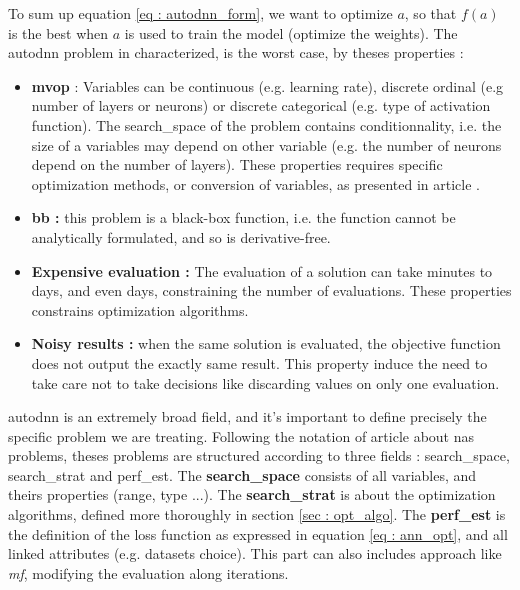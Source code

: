 To sum up equation \ref{eq : autodnn_form}, we want to optimize $a$, so that $f(a)$ is the best when $a$ is used to train the model (optimize the weights). The \acrshort{autodnn} problem in characterized, is the worst case, by theses properties : 
\begin{itemize}
    \item \textbf{\acrfull{mvop}} : Variables can be continuous (e.g. learning rate), discrete ordinal (e.g number of layers or neurons) or discrete categorical (e.g. type of activation function). The \gls{search_space} of the problem contains conditionnality, i.e. the size of a variables may depend on other variable (e.g. the number of neurons depend on the number of layers). These properties requires specific optimization methods, or conversion of variables, as presented in article \cite{talbi_metaheuristics_2024}.
    \item \textbf{\Gls{bb} :} this problem is a black-box function, i.e. the function cannot be analytically formulated, and so is derivative-free.
    \item \textbf{Expensive evaluation :} The evaluation of a solution can take minutes to days, and even days, constraining the number of evaluations. These properties constrains optimization algorithms. 
    \item \textbf{ Noisy results : } when the same solution is evaluated, the objective function does not output the exactly same result. This property induce the need to take care not to take decisions like discarding values on only one evaluation. 
\end{itemize}

\acrshort{autodnn} is an extremely broad field, and it's important to define precisely the specific problem we are treating. Following the notation of article \cite{elsken_neural_2019} about \acrshort{nas} problems, theses problems are structured according to three fields : \Gls{search_space}, \Gls{search_strat} and \Gls{perf_est}. The \textbf{\gls{search_space}} consists of all variables, and theirs properties (range, type ...). The \textbf{\gls{search_strat}} is about the optimization algorithms, defined more thoroughly in section \ref{sec : opt_algo}. The \textbf{\gls{perf_est}} is the definition of the loss function as expressed in equation \ref{eq : ann_opt}, and all linked attributes (e.g. datasets choice). This part can also includes approach like \textit{\gls{mf}}, modifying the evaluation along iterations.




